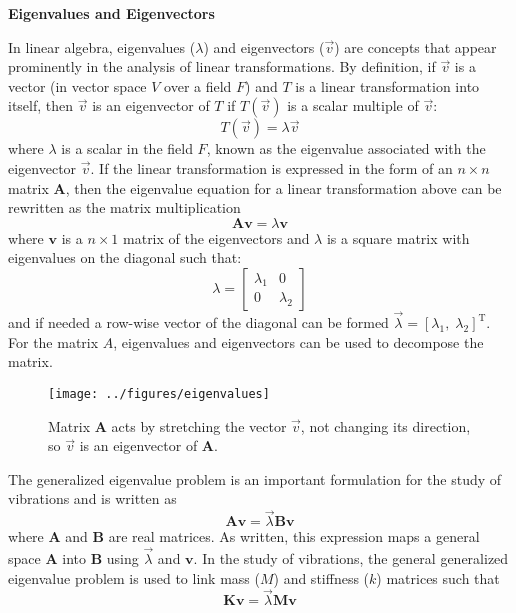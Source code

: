 \documentclass[12pt,letter]{article}
\begin{document}
	\begin{review}
	
		\textbf{Eigenvalues and Eigenvectors}
	
		\noindent In linear algebra, eigenvalues ($\lambda$) and eigenvectors ($\vec{v}$) are concepts that appear prominently in the analysis of linear transformations. By definition, if  $\vec{v}$ is a vector (in vector space $V$ over a field $F$) and $T$ is a linear transformation into itself, then $\vec{v}$ is an eigenvector of $T$ if $T(\vec{v})$ is a scalar multiple of $\vec{v}$:
		\begin{equation}
		T(\vec{v}) = \lambda\vec{v}
		\end{equation}
		where $\lambda$ is a scalar in the field $F$, known as the eigenvalue associated with the eigenvector $\vec{v}$. If the linear transformation is expressed in the form of an $n \times n$ matrix $\textbf{A}$, then the eigenvalue equation for a linear transformation above can be rewritten as the matrix multiplication
		\begin{equation}
		\textbf{A}\textbf{v} = \lambda\textbf{v}
		\end{equation}
		where $\textbf{v}$ is a $n \times 1$ matrix of the eigenvectors and $\lambda$ is a square matrix with eigenvalues on the diagonal such that:
		\begin{equation}
		\lambda = \begin{bmatrix} \lambda_1 & 0 \\  0  & \lambda_2 \end{bmatrix} 
			\label{eq:lambda_matrix}
		\end{equation}
		and if needed a row-wise vector of the diagonal can be formed $\vec{\lambda} = [ \lambda_1, \; \lambda_2]^\text{T}$. For the matrix $A$, eigenvalues and eigenvectors can be used to decompose the matrix.

		\begin{figure}[H]
			\centering
			\texttt{[image: ../figures/eigenvalues]}
			\caption{Matrix $\textbf{A}$ acts by stretching the vector $\vec{v}$, not changing its direction, so $\vec{v}$ is an eigenvector of $\textbf{A}$.}
			\label{fig:eigenvalues}
		\end{figure}
	
		The generalized eigenvalue problem is an important formulation for the study of vibrations and is written as 
		\begin{equation}
			\textbf{A}\textbf{v} = \vec{\lambda}\textbf{B}\textbf{v}
		\end{equation}	
		where $\textbf{A}$ and $\textbf{B}$ are real matrices. As written, this expression maps a general space $\textbf{A}$ into $\textbf{B}$ using $\vec{\lambda}$ and $\textbf{v}$. In the study of vibrations, the general generalized eigenvalue problem is used to link mass ($M$) and stiffness ($k$) matrices such that 
		\begin{equation}
			\textbf{K}\textbf{v} = \vec{\lambda}\textbf{M}\textbf{v}
		\end{equation}		
		
		
	\end{review}	
\end{document}

